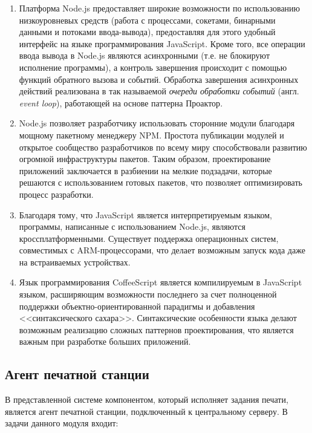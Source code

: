 \documentclass[a4paper,14pt,href]{article}
\begin{document}
\begin{enumerate}
  \item Платформа Node.js предоставляет широкие возможности по использованию низкоуровневых средств (работа с
  процессами, сокетами, бинарными данными и потоками ввода-вывода), предоставляя для этого удобный интерфейс на
  языке программирования JavaScript. Кроме того, все операции ввода вывода в Node.js являются асинхронными
  (т.е. не блокируют исполнение программы), а контроль завершения происходит с помощью функций обратного вызова
  и событий. Обработка завершения асинхронных действий реализована в так называемой \textit{очереди обработки событий}
  (англ. \textit{event loop})\cite{UnderstandingEvenLoop}, работающей на основе паттерна Проактор\cite{BoostProactor}.

  \item Node.js позволяет разработчику использовать сторонние модули благодаря мощному пакетному менеджеру NPM.
  Простота публикации модулей и открытое сообщество разработчиков по всему миру способствовали развитию огромной
  инфраструктуры пакетов\cite{NPMGrowth}. Таким образом, проектирование приложений заключается в разбиении на
  мелкие подзадачи, которые решаются с использованием готовых пакетов, что позволяет оптимизировать процесс разработки.

  \item Благодаря тому, что JavaScript является интерпретируемым языком, программы, написанные с использованием
  Node.js, являются кроссплатформенными. Существует поддержка операционных систем, совместимых с ARM-процессорами,
  что делает возможным запуск кода даже на встраиваемых устройствах.

  \item Язык программирования CoffeeScript является компилируемым в \newline JavaScript языком, расширяющим
  возможности последнего за счет полноценной поддержки объектно-ориентированной парадигмы и добавления
  <<синтаксического сахара>>. Синтаксические особенности языка делают возможным реализацию сложных паттернов
  проектирования, что является важным при разработке больших приложений\cite{CoffeeScriptCookbook}.
\end{enumerate}

\subsection{Агент печатной станции}
В представленной системе компонентом, который исполняет задания печати, является агент печатной станции, подключенный к
центральному серверу. В задачи данного модуля входит:
\end{document}
